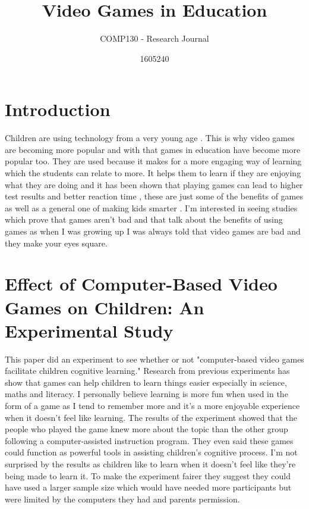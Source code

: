 \documentclass{scrartcl}
\title{Video Games in Education}
\subtitle{COMP130 - Research Journal}
\author{1605240}
\begin{document}
\maketitle


\section{Introduction}
Children are using technology from a very young age \cite{chuang2007effect} . This is why video games are becoming more popular and with that games in education have become more popular too. They are used because it makes for a more engaging way of learning which the students can relate to more. It helps them to learn if they are enjoying what they are doing and it has been shown that playing games can lead to higher test results \cite{marques2012video} and better reaction time \cite{janarthanan2012serious}, these are just some of the benefits of games as well as a general one of making kids smarter \cite{janarthanan2012serious}. I'm interested in seeing studies which prove that games aren't bad and that talk about the benefits of using games as when I was growing up I was always told that video games are bad and they make your eyes square. 


\section{Effect of Computer-Based Video Games on Children: An Experimental Study \cite{chuang2007effect}}
This paper did an experiment to see whether or not "computer-based video games facilitate children cognitive learning." Research from previous experiments has show that games can help children to learn things easier especially in science, maths and literacy. I personally believe learning is more fun when used in the form of a game as I tend to remember more and it's a more enjoyable experience when it doesn't feel like learning. The results of the experiment showed that the people who played the game knew more about the topic than the other group following a computer-assisted instruction program. They even said these games could function as powerful tools in assisting children's cognitive process. I'm not surprised by the results as children like to learn when it doesn't feel like they're being made to learn it. To make the experiment fairer they suggest they could have used a larger sample size which would have needed more participants but were limited by the computers they had and parents permission. 
\end{document}

